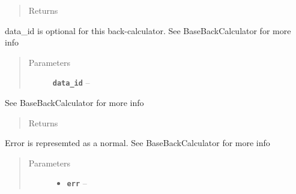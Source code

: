 \documentclass[letterpaper,10pt,english]{sphinxmanual}
\begin{document}
\begin{fulllineitems}
\begin{fulllineitems}
\begin{quote}
\begin{description}
\item[{Returns}] \leavevmode


\end{description}\end{quote}

\end{fulllineitems}


\begin{fulllineitems}
\label{modules:backcalc.JCoupBackCalc.get_random_err}
data\_id is optional for this back-calculator. See BaseBackCalculator for
more info
\begin{quote}\begin{description}
\item[{Parameters}] \leavevmode
\textbf{\texttt{data\_id}} -- 

\end{description}\end{quote}

\end{fulllineitems}


\begin{fulllineitems}
\label{modules:backcalc.JCoupBackCalc.get_random_params}
See BaseBackCalculator for more info
\begin{quote}\begin{description}
\item[{Returns}] \leavevmode


\end{description}\end{quote}

\end{fulllineitems}


\begin{fulllineitems}
\label{modules:backcalc.JCoupBackCalc.logp_err}
Error is represemted as a normal. See BaseBackCalculator for more info
\begin{quote}\begin{description}
\item[{Parameters}] \leavevmode\begin{itemize}
\item {} 
\textbf{\texttt{err}} -- 


\end{itemize}
\end{description}
\end{quote}
\end{fulllineitems}
\end{fulllineitems}
\end{document}
